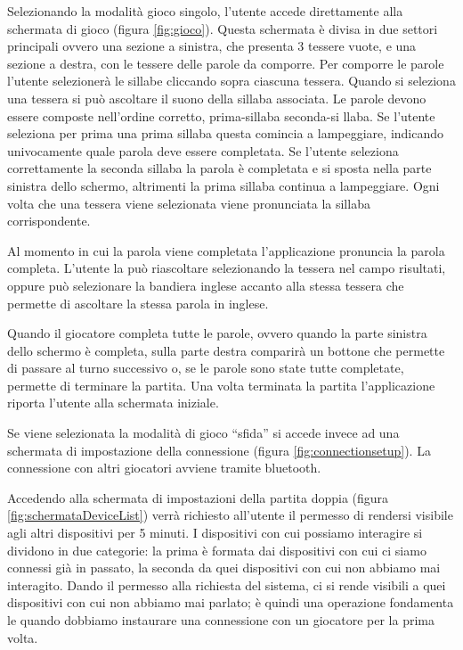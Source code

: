 

Selezionando la modalità gioco singolo, l'utente accede direttamente alla schermata di gioco (figura \ref{fig:gioco}). Questa schermata è divisa in due settori principali ovvero una sezione a sinistra, che presenta 3 tessere vuote, e una sezione a destra, con le tessere delle parole da comporre. Per comporre le parole l'utente selezionerà le sillabe cliccando sopra ciascuna tessera. Quando si seleziona una tessera si può ascoltare il suono della sillaba associata. Le parole devono essere composte nell'ordine corretto, prima-sillaba seconda-si llaba. Se l'utente seleziona per prima una prima sillaba questa comincia a lampeggiare, indicando univocamente quale parola deve essere completata. Se l'utente seleziona correttamente la seconda sillaba la parola è completata e si sposta nella parte sinistra dello schermo, altrimenti la prima sillaba continua a lampeggiare. Ogni volta che una tessera viene selezionata viene pronunciata la sillaba corrispondente.

Al momento in cui la parola viene completata l'applicazione pronuncia la parola completa. L'utente la può riascoltare selezionando la tessera nel campo risultati, oppure può selezionare la bandiera inglese accanto alla stessa tessera che permette di ascoltare la stessa parola in inglese.

Quando il giocatore completa tutte le parole, ovvero quando la parte sinistra dello schermo è completa, sulla parte destra comparirà un bottone che permette di passare al turno successivo o, se le parole sono state tutte completate, permette di terminare la partita. Una volta terminata la partita l'applicazione riporta l'utente alla schermata iniziale.


Se viene selezionata la modalità di gioco ``sfida'' si accede invece ad una schermata di impostazione della connessione (figura \ref{fig:connectionsetup}). La connessione con altri giocatori avviene tramite bluetooth.

Accedendo alla schermata di impostazioni della partita doppia (figura \ref{fig:schermataDeviceList}) verrà richiesto all'utente il permesso di rendersi visibile agli altri dispositivi per 5 minuti. I dispositivi con cui possiamo interagire si dividono in due categorie: la prima è formata dai dispositivi con cui ci siamo connessi già in passato, la seconda da quei dispositivi con cui non abbiamo mai interagito. Dando il permesso alla richiesta del sistema, ci si rende visibili a quei dispositivi con cui non abbiamo mai parlato; è quindi una operazione fondamenta le quando dobbiamo instaurare una connessione con un giocatore per la prima volta.

